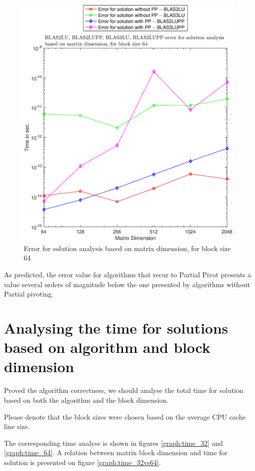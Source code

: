 \documentclass[conference,compsoc]{IEEEtran}
\begin{document}
     \begin{figure}[H]
     \centering
     \includegraphics[width=1\columnwidth]{error_64.eps}
     \caption{Error for solution analysis based on matrix dimension, for block size 64}
     \label{graph:error_64}
     \end{figure}
     
     
     As predicted, the error value for algorithms that recur to Partial Pivot presents a value several orders of magnitude below the one presented by algorithms without Partial pivoting.
     
\section{Analysing the time for solutions based on algorithm and block dimension}  

Proved the algorithm correctness, we should analyse the total time for solution based on both the algorithm and the block dimension.\par 
Please denote that the block sizes were chosen based on the average CPU cache line size. \par The corresponding time analyse is shown in figures \ref{graph:time_32} and \ref{graph:time_64}. A relation between matrix block dimension and time for solution is presented on figure \ref{graph:time_32vs64}.
\end{document}
